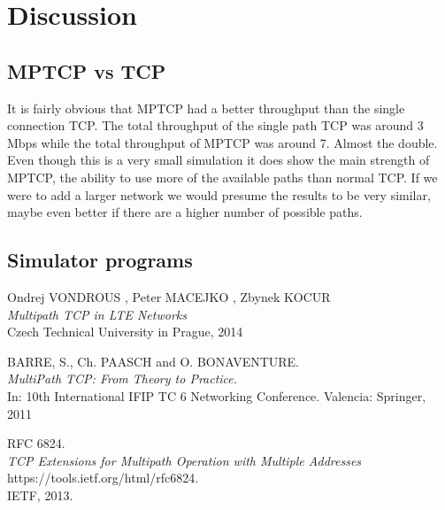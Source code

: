 \documentclass[11pt,twocolumn]{article}
\begin{document}

\section{Discussion}

\subsection{MPTCP vs TCP}
It is fairly obvious that MPTCP had a better throughput than the single connection TCP. The total throughput of the single path TCP was around 3 Mbps while the total throughput of MPTCP was around 7. Almost the double. Even though this is a very small simulation it does show the main strength of MPTCP, the ability to use more of the available paths than normal TCP. If we were to add a larger network we would presume the results to be very similar, maybe even better if there are a higher number of possible paths.  


\subsection{Simulator programs}

\newpage

\begin{thebibliography}{9}

Ondrej VONDROUS , Peter MACEJKO , Zbynek KOCUR \\
\emph{Multipath TCP in LTE Networks}\\
Czech Technical University in Prague, 2014

BARRE, S., Ch. PAASCH and O. BONAVENTURE.\\
\emph{MultiPath TCP: From Theory to Practice.}\\
In: 10th International IFIP TC 6 Networking
Conference. Valencia: Springer, 2011

RFC 6824.  \\
\emph{TCP Extensions for Multipath Operation with Multiple Addresses} \\ 
https://tools.ietf.org/html/rfc6824.\\ IETF, 2013.


\end{thebibliography}
\end{document}
